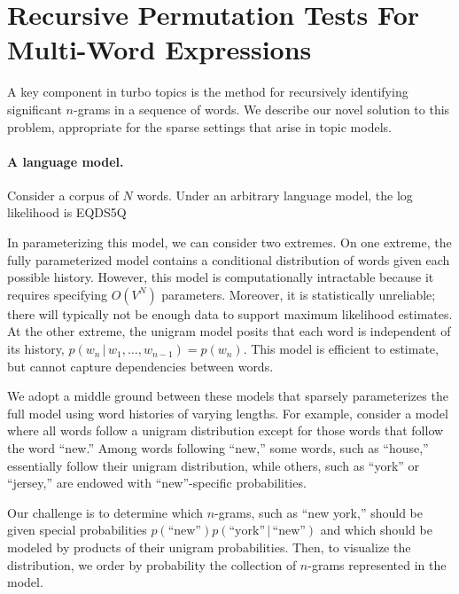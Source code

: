 \documentclass[11pt]{article}
\begin{document}
\section{Recursive Permutation Tests For Multi-Word Expressions}
\label{sec:model}

A key component in turbo topics is the method for recursively
identifying significant $n$-grams in a sequence of words.  We describe
our novel solution to this problem, appropriate for the sparse
settings that arise in topic models.

\paragraph{A language model.}  Consider a corpus of $N$ words. Under
an arbitrary language model, the log likelihood is
EQDS5Q

In parameterizing this model, we can consider two extremes.  On one
extreme, the fully parameterized model contains a conditional
distribution of words given each possible history.  However, this
model is computationally intractable because it requires specifying
$O(V^N)$ parameters.  Moreover, it is statistically unreliable; there
will typically not be enough data to support maximum likelihood
estimates.  At the other extreme, the unigram model posits that each
word is independent of its history, $p(w_n {\,|\,} w_1, \ldots, w_{n-1}) =
p(w_n)$.  This model is efficient to estimate, but cannot capture
dependencies between words.

We adopt a middle ground between these models that sparsely
parameterizes the full model using word histories of varying lengths.
For example, consider a model where all words follow a unigram
distribution except for those words that follow the word ``new.''
Among words following ``new,'' some words, such as ``house,''
essentially follow their unigram distribution, while others, such as
``york'' or ``jersey,'' are endowed with ``new''-specific
probabilities.

Our challenge is to determine which $n$-grams, such as ``new york,''
should be given special probabilities $p(\textrm{``new''})
p(\textrm{``york''} {\,|\,} \textrm{``new''})$ and which should be modeled
by products of their unigram probabilities.  Then, to visualize the
distribution, we order by probability the collection of $n$-grams
represented in the model.
\end{document}
